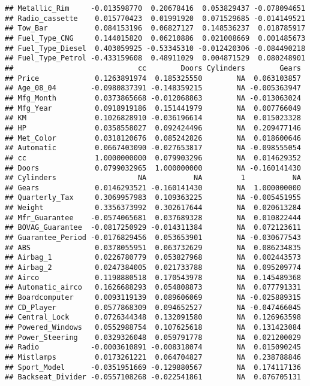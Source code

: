 \documentclass[]{article}
\begin{document}
\begin{verbatim}
## Metallic_Rim     -0.013598770  0.20678416  0.053829437 -0.078094651
## Radio_cassette    0.015770423  0.01991920  0.071529685 -0.014149521
## Tow_Bar           0.084153196  0.06827127  0.148536237  0.018785917
## Fuel_Type_CNG     0.144015820  0.06210886  0.021008669  0.001485673
## Fuel_Type_Diesel  0.403059925 -0.53345310 -0.012420306 -0.084490218
## Fuel_Type_Petrol -0.433159608  0.48911029  0.004871529  0.080248901
##                             cc        Doors Cylinders        Gears
## Price             0.1263891974  0.185325550        NA  0.063103857
## Age_08_04        -0.0980837391 -0.148359215        NA -0.005363947
## Mfg_Month         0.0373865668 -0.012068863        NA -0.013063024
## Mfg_Year          0.0918919186  0.151441979        NA  0.007766049
## KM                0.1026828910 -0.036196614        NA  0.015023328
## HP                0.0358558027  0.092424496        NA  0.209477146
## Met_Color         0.0318120676  0.085242826        NA  0.018600646
## Automatic         0.0667403090 -0.027653817        NA -0.098555054
## cc                1.0000000000  0.079903296        NA  0.014629352
## Doors             0.0799032965  1.000000000        NA -0.160141430
## Cylinders                   NA           NA         1           NA
## Gears             0.0146293521 -0.160141430        NA  1.000000000
## Quarterly_Tax     0.3069957983  0.109363225        NA -0.005451955
## Weight            0.3356373992  0.302617644        NA  0.020613284
## Mfr_Guarantee    -0.0574065681  0.037689328        NA  0.010822444
## BOVAG_Guarantee  -0.0817250929 -0.014311384        NA  0.072123611
## Guarantee_Period -0.0176829456  0.053653901        NA -0.030677543
## ABS               0.0378055951  0.063732629        NA  0.086234835
## Airbag_1          0.0226780779  0.053827968        NA  0.002443573
## Airbag_2          0.0247384005  0.021733788        NA  0.095209774
## Airco             0.1198880518  0.170543978        NA  0.145489368
## Automatic_airco   0.1626688293  0.054808873        NA  0.077791331
## Boardcomputer     0.0093119139  0.089606069        NA -0.025889315
## CD_Player         0.0577868309  0.094652527        NA -0.047466045
## Central_Lock      0.0726344348  0.132091580        NA  0.126963598
## Powered_Windows   0.0552988754  0.107625618        NA  0.131423084
## Power_Steering    0.0329326048  0.059791778        NA  0.021200029
## Radio            -0.0003610891 -0.008318074        NA  0.015090245
## Mistlamps         0.0173261221  0.064704827        NA  0.238788846
## Sport_Model      -0.0351951669 -0.129880567        NA  0.174117136
## Backseat_Divider -0.0557108268 -0.022541861        NA  0.076705131

\end{verbatim}
\end{document}
